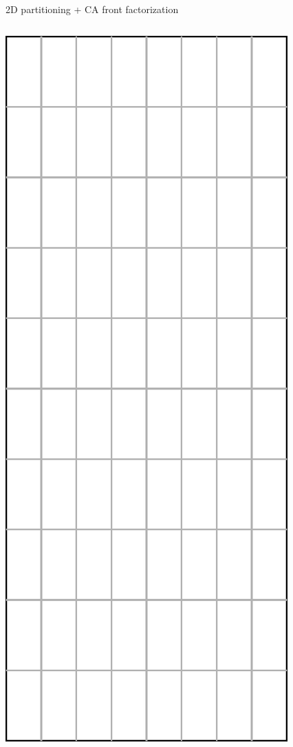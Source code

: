 \begin{frame}{2D partitioning + CA front factorization}
\begin{columns}
\begin{column}{0.2\textwidth}
\begin{center}
        \includegraphics[width=\textwidth]{figures/2d}
      \end{center}
    \end{column}
  \end{columns}
\end{frame}

